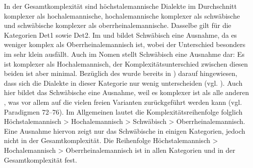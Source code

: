 
\begin{table}[]
\caption{Durchschnittliche Komplexität pro Dialektgruppe und Kategorie}\label{table6.18}
\end{table}

In der Gesamtkomplexität sind höchstalemannische Dialekte im Durchschnitt komplexer als hochalemannische, hochalemannische komplexer als schwäbische und schwäbische komplexer als oberrheinalemannische. Dasselbe gilt für die Kategorien Det1 sowie Det2. Im  und  bildet Schwäbisch eine Ausnahme, da es weniger komplex als Oberrheinalemannisch ist, wobei der Unterschied besonders im  sehr klein ausfällt. Auch im Nomen stellt Schwäbisch eine Ausnahme dar: Es ist komplexer als Hochalemannisch, der Komplexitätsunterschied zwischen diesen beiden  ist aber minimal. Bezüglich des  wurde bereits in ) darauf hingewiesen, dass sich die Dialekte in dieser Kategorie nur wenig unterscheiden (vgl. ). Auch hier bildet das Schwäbische eine Ausnahme, weil es komplexer ist als alle anderen , was vor allem auf die vielen freien Varianten zurückgeführt werden kann (vgl. Paradigmen 72–76). Im Allgemeinen lautet die Komplexitätsreihenfolge folglich Höchstalemannisch > Hochalemannisch > Schwäbisch > Oberrheinalemannisch. Eine Ausnahme hiervon zeigt nur das Schwäbische in einigen Kategorien, jedoch nicht in der Gesamtkomplexität. Die Reihenfolge Höchstalemannisch > Hochalemannisch > Oberrheinalemannisch ist in allen Kategorien und in der Gesamtkomplexität fest.

